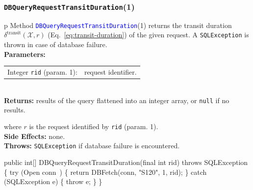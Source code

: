 \documentclass{article}
\def\nwendcode{\endtrivlist \endgroup}      %
\let\nwdocspar=\par
\theoremstyle{definition}                   %
\begin{document}
\subsubsection{{\tt{}\protect{}DBQueryRequestTransitDuration}(1)}
\begin{tabular}{p{\textwidth}}
\toprule
{}
Method \textcolor{blue}{{\tt{}\protect{}DBQueryRequestTransitDuration}}(1) returns the
transit duration $\delta^\textrm{transit}(\mathcal{X},r)$
(Eq.~\ref{eq:transit-duration}) of the given request.
A {\tt{}SQLException} is thrown in case of database failure.\\
\midrule
\textbf{Parameters:}\\
\begin{tabular}{lp{116mm}}
Integer {\tt{}rid} (param. 1):&request identifier.
\end{tabular}\\
\textbf{Returns:} results of the query flattened into an integer array,
or {\tt{}null} if no results.


where $r$ is the request identified by {\tt{}rid} (param. 1).\\
\textbf{Side Effects:} none.\\
\textbf{Throws:} {\tt{}SQLException} if database failure is encountered.\\
\bottomrule
\end{tabular}
\nwenddocs{}\plusendmoddef
public int[] DBQueryRequestTransitDuration(final int rid) throws SQLException \{
  try (\LA{}Open \code{}conn\edoc{}~{\nwtagstyle{}}\RA{}) \{
    return DBFetch(conn, "S120", 1, rid);
  \} catch (SQLException e) \{
    throw e;
  \}
\}
\eatline
{}\nwendcode{}\nwdocspar
\end{document}
